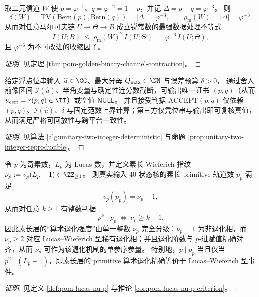 \begin{conclusion}[黄金互补二元信道的最强数据处理常数：\texorpdfstring{$\delta=\rho_{\mathrm{m}}=\varphi^{-3}$}{delta=rho_m=phi^-3} 与 \texorpdfstring{$I$}{I}-收缩 \texorpdfstring{$\varphi^{-6}$}{phi^-6}]\label{con:xi-terminal-golden-binary-channel-sdpi}
取二元信道 \(W\) 使 \(p=\varphi^{-1}\)、\(q=\varphi^{-2}=1-p\)，并记 \(\Delta=p-q=\varphi^{-3}\)。
则
\[
\delta(W)=\mathrm{TV}(\mathrm{Bern}(p),\mathrm{Bern}(q))=|\Delta|=\varphi^{-3},
\qquad
\rho_{\mathrm{m}}(W)=|\Delta|=\varphi^{-3}.
\]
从而对任意马尔可夫链 \(U\to \Theta\to B\) 成立锐常数的最强数据处理不等式
\[
I(U;B)\ \le\ \rho_{\mathrm{m}}(W)^2\,I(U;\Theta)\ =\ \varphi^{-6}\,I(U;\Theta),
\]
且 \(\varphi^{-6}\) 为不可改进的收缩因子。
\end{conclusion}
\begin{proof}[证明]
见定理 \ref{thm:pom-golden-binary-channel-contraction}。
\end{proof}

\begin{conclusion}\label{con:xi-terminal-bitstring-rational-certificate-replayability}
给定浮点位串输入 \(\widehat u\in\CC\)、最大分母 \(Q_{\max}\in\NN\) 与误差预算 \(\delta>0\)，
通过舍入前像区间 \(\mathcal I(\widehat u)\)、半角变量与确定性连分数截断，可输出唯一证书 \((p,q)\)（从而 \(u_{\mathrm{cert}}=r(p,q)\in\TT\)）或空值 \(\mathsf{NULL}\)。
并且接受判据 \(\mathrm{ACCEPT}(p,q)\) 仅依赖 \((p,q)\)、\(\mathcal I(\widehat u)\)、\(\delta\) 与固定范数上界计算；第三方仅凭位串与输出即可复核真值，从而满足严格可回放性与跨平台一致性。
\end{conclusion}
\begin{proof}[证明]
见算法 \ref{alg:unitary-two-integer-deterministic} 与命题 \ref{prop:unitary-two-integer-reproducible}。
\end{proof}

\begin{conclusion}\label{con:xi-terminal-wieferich-fingerprint}
令 \(p\) 为奇素数，\(L_p\) 为 Lucas 数，并定义素长 Wieferich 指纹
\(
\nu_p:=v_p(L_p-1)\in\ZZ_{\ge 1}
\)。
则真实输入 40 状态核的素长 primitive 轨道数 \(p_p\) 满足
\[
v_p(p_p)=\nu_p-1,
\]
从而对任意 \(k\ge 1\) 有整数判据
\[
p^k\mid p_p\ \Longleftrightarrow\ \nu_p\ge k+1.
\]
因此素长层的“算术退化强度”由单一整数 \(\nu_p\) 完全分级：\(\nu_p=1\) 为非退化相，而 \(\nu_p\ge 2\) 对应 Lucas--Wieferich 型稀有退化相；并且退化阶数与 \(p\)-进赋值精确对齐，从而 \(\nu_p\) 可作为该退化机制的单参序参量。
特别地，\(p\mid p_p\) 当且仅当 \(p^2\mid(L_p-1)\)，即素长层的 primitive 算术退化精确等价于 Lucas--Wieferich 型事件。
\end{conclusion}
\begin{proof}[证明]
见定义 \ref{def:pom-lucas-nu-p} 与推论 \ref{cor:pom-lucas-nu-p-criterion}。
\end{proof}

